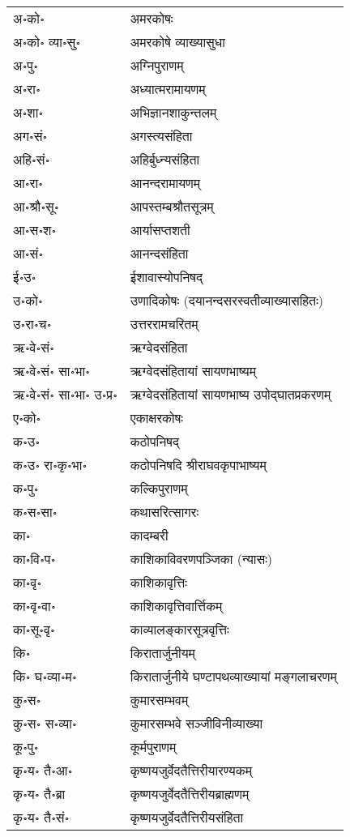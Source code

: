 \begin{longtable}{ll}
अ॰को॰ & अमरकोषः\\
अ॰को॰ व्या॰सु॰ & अमरकोषे व्याख्यासुधा\\
अ॰पु॰ & अग्निपुराणम्\\
अ॰रा॰ & अध्यात्मरामायणम्\\
अ॰शा॰ & अभिज्ञानशाकुन्तलम्\\
अग॰सं॰ & अगस्त्यसंहिता\\
अहि॰सं॰ & अहिर्बुध्न्यसंहिता\\
आ॰रा॰ & आनन्दरामायणम्\\
आ॰श्रौ॰सू॰ & आपस्तम्बश्रौतसूत्रम्\\
आ॰स॰श॰ & आर्यासप्तशती\\
आ॰सं॰ & आनन्दसंहिता\\
ई॰उ॰ & ईशावास्योपनिषद्\\
उ॰को॰ & उणादिकोषः (दयानन्द\-सरस्वती\-व्याख्या\-सहितः)\\
उ॰रा॰च॰ & उत्तररामचरितम्\\
ऋ॰वे॰सं॰ & ऋग्वेदसंहिता\\
ऋ॰वे॰सं॰ सा॰भा॰ & ऋग्वेदसंहितायां सायणभाष्यम्\\
ऋ॰वे॰सं॰ सा॰भा॰ उ॰प्र॰ & ऋग्वेदसंहितायां सायणभाष्य उपोद्घातप्रकरणम्\\
ए॰को॰ & एकाक्षरकोषः\\
क॰उ॰ & कठोपनिषद्\\
क॰उ॰ रा॰कृ॰भा॰ & कठोपनिषदि श्रीराघवकृपाभाष्यम्\\
क॰पु॰ & कल्किपुराणम्\\
क॰स॰सा॰ & कथासरित्सागरः\\
का॰ & कादम्बरी\\
का॰वि॰प॰ & काशिकाविवरणपञ्जिका (न्यासः)\\
का॰वृ॰ & काशिकावृत्तिः\\
का॰वृ॰वा॰ & काशिकावृत्तिवार्त्तिकम्\\
का॰सू॰वृ॰ & काव्यालङ्कारसूत्रवृत्तिः\\
कि॰ & किरातार्जुनीयम्\\
कि॰ घ॰व्या॰म॰ & किरातार्जुनीये घण्टापथव्याख्यायां मङ्गलाचरणम्\\
कु॰स॰ & कुमारसम्भवम्\\
कु॰स॰ स॰व्या॰ & कुमारसम्भवे सञ्जीविनीव्याख्या\\
कू॰पु॰ & कूर्मपुराणम्\\
कृ॰य॰ तै॰आ॰ & कृष्णयजुर्वेदतैत्तिरीयारण्यकम्\\
कृ॰य॰ तै॰ब्रा & कृष्णयजुर्वेदतैत्तिरीयब्राह्मणम्\\
कृ॰य॰ तै॰सं॰ & कृष्णयजुर्वेदतैत्तिरीयसंहिता\\

\end{longtable}
